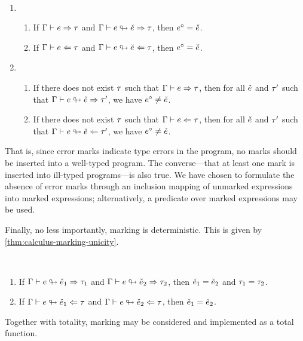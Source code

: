 \begin{theorem}[name=Marking of Well-Typed/Ill-Typed Expressions] \ %
  \label{thm:calculus-marking-well-ill-typed}
  \begin{enumerate}
    \item \begin{enumerate}
        \item If $\Gamma \vdash e \Rightarrow \tau$ and $\Gamma \vdash e \looparrowright \check{e} \Rightarrow \tau$,
          then $e^{\circ} = \check{e}$.
        \item If $\Gamma \vdash e \Leftarrow \tau$ and $\Gamma \vdash e \looparrowright \check{e} \Leftarrow \tau$,
          then $e^{\circ} = \check{e}$.
      \end{enumerate}

    \item \begin{enumerate}
        \item If there does not exist $\tau$ such that $\Gamma \vdash e \Rightarrow \tau$, then for all
          $\check{e}$ and $\tau'$ such that $\Gamma \vdash e \looparrowright \check{e} \Rightarrow \tau'$, we have
          $e^{\circ} \neq \check{e}$.
        \item If there does not exist $\tau$ such that $\Gamma \vdash e \Leftarrow \tau$, then for all
          $\check{e}$ and $\tau'$ such that $\Gamma \vdash e \looparrowright \check{e} \Leftarrow \tau'$, we have
          $e^{\circ} \neq \check{e}$.
      \end{enumerate}
  \end{enumerate}
\end{theorem}
%
That is, since error marks indicate type errors in the program, no marks should be inserted
into a well-typed program. The converse---that at least one mark is inserted into ill-typed
programs---is also true. We have chosen to formulate the absence of error marks through an inclusion
mapping of unmarked expressions into marked expressions; alternatively, a predicate over marked
expressions may be used. %

Finally, no less importantly, marking is deterministic. This is given by
\cref{thm:calculus-marking-unicity}.
%
\begin{theorem}[name=Marking Unicity] \
  \label{thm:calculus-marking-unicity}
  \begin{enumerate}
    \item If $\Gamma \vdash e \looparrowright \check{e}_1 \Rightarrow \tau_1$ and
      $\Gamma \vdash e \looparrowright \check{e}_2 \Rightarrow \tau_2$, then $\check{e}_1 = \check{e}_2$ and $\tau_1 =
      \tau_2$.
    \item If $\Gamma \vdash e \looparrowright \check{e}_1 \Leftarrow \tau$ and
      $\Gamma \vdash e \looparrowright \check{e}_2 \Leftarrow \tau$, then $\check{e}_1 = \check{e}_2$.
  \end{enumerate}
\end{theorem}
%
Together with totality, marking may be considered and implemented as a total function.

